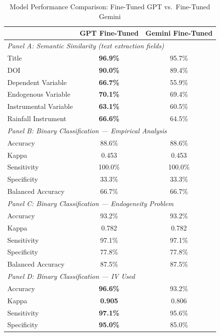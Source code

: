 \begin{table}[htbp]
\centering
\caption{Model Performance Comparison: Fine-Tuned GPT vs.\ Fine-Tuned Gemini}
\label{tab:model_comparison}
\begin{tabular}{lcc}
\toprule
& \textbf{GPT Fine-Tuned} & \textbf{Gemini Fine-Tuned} \\
\midrule
\multicolumn{3}{l}{\textit{Panel A: Semantic Similarity (text extraction fields)}} \\
\midrule
Title               & \textbf{96.9\%} & 95.7\% \\
DOI                 & \textbf{90.0\%} & 89.4\% \\
Dependent Variable  & \textbf{66.7\%} & 55.9\% \\
Endogenous Variable & \textbf{70.1\%} & 69.4\% \\
Instrumental Variable & \textbf{63.1\%} & 60.5\% \\
Rainfall Instrument & \textbf{66.6\%} & 64.5\% \\
\midrule
\multicolumn{3}{l}{\textit{Panel B: Binary Classification — Empirical Analysis}} \\
\midrule
Accuracy            & 88.6\% & 88.6\% \\
Kappa               & 0.453  & 0.453  \\
Sensitivity         & 100.0\% & 100.0\% \\
Specificity         & 33.3\% & 33.3\% \\
Balanced Accuracy   & 66.7\% & 66.7\% \\
\midrule
\multicolumn{3}{l}{\textit{Panel C: Binary Classification — Endogeneity Problem}} \\
\midrule
Accuracy            & 93.2\% & 93.2\% \\
Kappa               & 0.782  & 0.782  \\
Sensitivity         & 97.1\% & 97.1\% \\
Specificity         & 77.8\% & 77.8\% \\
Balanced Accuracy   & 87.5\% & 87.5\% \\
\midrule
\multicolumn{3}{l}{\textit{Panel D: Binary Classification — IV Used}} \\
\midrule
Accuracy            & \textbf{96.6\%} & 93.2\% \\
Kappa               & \textbf{0.905}  & 0.806  \\
Sensitivity         & \textbf{97.1\%} & 95.6\% \\
Specificity         & \textbf{95.0\%} & 85.0\% \\

\end{tabular}
\end{table}

